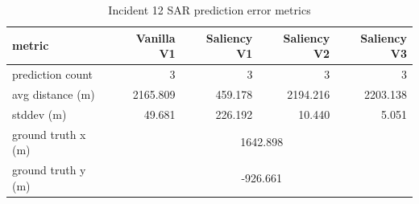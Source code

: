 \begin{table}[ht]
\centering
\caption{Incident 12 SAR prediction error metrics}
\label{tab:sar-incident-12}
\begin{tabular}{lrrrr}
\hline
metric & Vanilla V1 & Saliency V1 & Saliency V2 & Saliency V3 \\
\hline
prediction count & 3 & 3 & 3 & 3 \\
avg distance (m) & 2165.809 & 459.178 & 2194.216 & 2203.138 \\
stddev (m) & 49.681 & 226.192 & 10.440 & 5.051 \\
ground truth x (m) & \multicolumn{4}{c}{1642.898} \\
ground truth y (m) & \multicolumn{4}{c}{-926.661} \\
\hline
\end{tabular}
\end{table}
